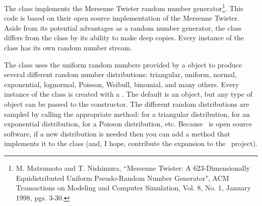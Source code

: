 The  class implements the Mersenne Twister random number generator\footnote{M. Matsumoto and T. Nishimura, ``Mersenne Twister: A 623-Dimensionally Equidistributed Uniform Pseudo-Random Number Generator", ACM Transactions on Modeling and Computer Simulation, Vol. 8, No. 1, January 1998, pgs. 3-30.}. This code is based on their open source implementation of the Mersenne Twister. Aside from its potential advantages as a random number generator, the  class differs from the  class by its ability to make deep copies. Every instance of the  class has its own random number stream.

The  class uses the uniform random numbers provided by a  object to produce several different random number distributions: triangular, uniform, normal, exponential, lognormal, Poisson, Weibull, binomial, and many others. Every instance of the  class is created with a . The default is an  object, but any type of  object can be passed to the  constructor. The different random distributions are sampled by calling the appropriate method:  for a triangular distribution,  for an exponential distribution,  for a Poisson distribution, etc. Because \adevs\ is open source software, if a new distribution is needed then you can add a method that implements it to the  class (and, I hope, contribute the expansion to the \adevs\ project).
